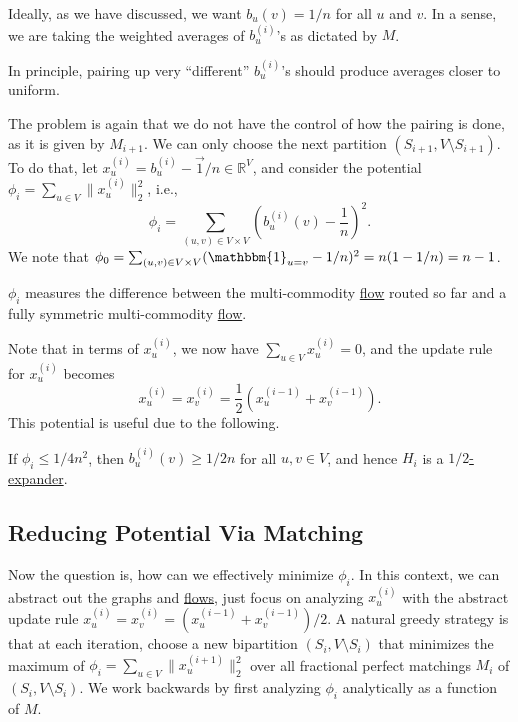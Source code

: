 Ideally, as we have discussed, we want \(b_u(v) = 1 / n\) for all \(u\) and \(v\). In a sense, we are taking the weighted averages of \(b_u^{(i)}\)'s as dictated by \(M\).

\begin{intuition}
	In principle, pairing up very ``different'' \(b_u^{(i)}\)'s should produce averages closer to uniform.
\end{intuition}

The problem is again that we do not have the control of how the pairing is done, as it is given by \(M_{i+1}\). We can only choose the next partition \((S_{i+1}, V\setminus S_{i+1})\). To do that, let \(x_u^{(i)} = b_u^{(i)} - \vec{1} / n \in \mathbb{R} ^V\), and consider the potential \(\phi _i = \sum_{u \in V} \lVert x_u^{(i)} \rVert _2^2\), i.e.,
\[
	\phi _i
	= \sum_{(u, v) \in V \times V} \left( b_u^{(i)}(v) - \frac{1}{n} \right) ^2.
\]
We note that \(\phi _0 = \sum_{(u, v) \in V \times V} (\mathbbm{1}_{u = v} - 1 / n)^2 = n (1 - 1 / n) = n - 1\).

\begin{intuition}
	\(\phi _i\) measures the difference between the multi-commodity \hyperref[def:flow]{flow} routed so far and a fully symmetric multi-commodity \hyperref[def:flow]{flow}.
\end{intuition}

Note that in terms of \(x_u^{(i)}\), we now have \(\sum_{u \in V} x_u^{(i)} = 0\), and the update rule for \(x_u^{(i)}\) becomes
\[
	x_u^{(i)}
	= x_v^{(i)}
	= \frac{1}{2} (x_u^{(i-1)} + x_v^{(i-1)}).
\]
This potential is useful due to the following.

\begin{claim}\label{clm:cut-matching-goal}
	If \(\phi _i \leq 1 / 4n^2\), then \(b_u^{(i)}(v) \geq 1 / 2n\) for all \(u, v \in V\), and hence \(H_i\) is a \hyperref[def:expander]{\(1 / 2\)-expander}.
\end{claim}

\subsection{Reducing Potential Via Matching}
Now the question is, how can we effectively minimize \(\phi _i\). In this context, we can abstract out the graphs and \hyperref[def:flow]{flows}, just focus on analyzing \(x_u^{(i)}\) with the abstract update rule \(x_u^{(i)} = x_v^{(i)} = (x_u^{(i-1)} + x_v^{(i-1)}) / 2\). A natural greedy strategy is that at each iteration, choose a new bipartition \((S_i , V\setminus S_i )\) that minimizes the maximum of \(\phi _i = \sum_{u \in V} \lVert x_u^{(i+1)} \rVert _2^2\) over all fractional perfect matchings \(M_i \) of \((S_i , V\setminus S_i )\). We work backwards by first analyzing \(\phi _i\) analytically as a function of \(M\).

